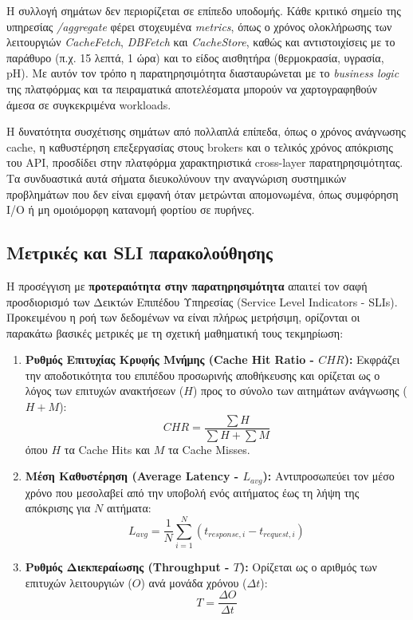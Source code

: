 Η συλλογή σημάτων δεν περιορίζεται σε επίπεδο υποδομής. Κάθε κριτικό σημείο της
υπηρεσίας \textit{/aggregate} φέρει στοχευμένα \textit{metrics}, όπως ο χρόνος
ολοκλήρωσης των λειτουργιών \textit{CacheFetch}, \textit{DBFetch} και
\textit{CacheStore}, καθώς και αντιστοιχίσεις με το παράθυρο (π.χ. 15 λεπτά, 1
ώρα) και το είδος αισθητήρα (θερμοκρασία, υγρασία, pH). Με αυτόν τον τρόπο η
παρατηρησιμότητα διασταυρώνεται με το \textit{business logic} της πλατφόρμας
και τα πειραματικά αποτελέσματα μπορούν να χαρτογραφηθούν άμεσα σε συγκεκριμένα
workloads.

Η δυνατότητα συσχέτισης σημάτων από πολλαπλά επίπεδα, όπως ο χρόνος ανάγνωσης
cache, η καθυστέρηση επεξεργασίας στους brokers και ο τελικός χρόνος απόκρισης
του API, προσδίδει στην πλατφόρμα χαρακτηριστικά cross-layer παρατηρησιμότητας.
Τα συνδυαστικά αυτά σήματα διευκολύνουν την αναγνώριση συστημικών προβλημάτων
που δεν είναι εμφανή όταν μετρώνται απομονωμένα, όπως συμφόρηση I/O ή μη
ομοιόμορφη κατανομή φορτίου σε πυρήνες.

\subsection{Μετρικές και SLI παρακολούθησης}

Η προσέγγιση με \textbf{προτεραιότητα στην παρατηρησιμότητα} απαιτεί τον σαφή
προσδιορισμό των Δεικτών Επιπέδου Υπηρεσίας (Service Level Indicators - SLIs).
Προκειμένου η ροή των δεδομένων να είναι πλήρως μετρήσιμη, ορίζονται οι
παρακάτω βασικές μετρικές με τη σχετική μαθηματική τους τεκμηρίωση:

\begin{enumerate}
	\item \textbf{Ρυθμός Επιτυχίας Κρυφής Μνήμης (Cache Hit Ratio - $CHR$):}
	      Εκφράζει την αποδοτικότητα του επιπέδου προσωρινής αποθήκευσης και
	      ορίζεται ως ο λόγος των επιτυχών ανακτήσεων ($H$) προς το σύνολο
	      των αιτημάτων ανάγνωσης ($H + M$): \[ CHR = \frac{\sum H}{\sum H +
			      \sum M} \] όπου $H$ τα Cache Hits και $M$ τα Cache Misses.

	\item \textbf{Μέση Καθυστέρηση (Average Latency - $L_{avg}$):}
	      Αντιπροσωπεύει τον μέσο χρόνο που μεσολαβεί από την υποβολή ενός
	      αιτήματος έως τη λήψη της απόκρισης για $N$ αιτήματα: \[ L_{avg} =
		      \frac{1}{N} \sum_{i=1}^{N} (t_{response,i} - t_{request,i}) \]

	\item \textbf{Ρυθμός Διεκπεραίωσης (Throughput - $T$):} Ορίζεται ως ο
	      αριθμός των επιτυχών λειτουργιών ($O$) ανά μονάδα χρόνου ($\Delta
		      t$): \[ T = \frac{\Delta O}{\Delta t} \]
\end{enumerate}



